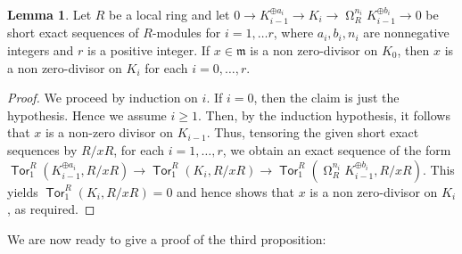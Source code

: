 \documentclass{amsart}
\theoremstyle{plain} %
\theoremstyle{definition}
\newtheorem{lem}[thm]{Lemma}
\newcommand{\fm}{\mathfrak{m}}
\def\Tor{\operatorname{\mathsf{Tor}}}
\DeclareMathOperator{\syz}{\Omega}
\begin{document}
\begin{lem} \label{rmk1} Let $R$ be a local ring and let  $0 \to K_{i-1}^{\oplus a_i} \to K_i \to \syz^{n_i}_R K_{i-1}^{\oplus b_i} \to 0$ be short exact sequences of $R$-modules for $i=1, \ldots r$, where $a_i, b_i, n_i$ are nonnegative integers and $r$ is a positive integer. If $x\in \fm$ is a non zero-divisor on $K_0$, then $x$ is a non zero-divisor on $K_i$ for each $i=0, \ldots, r$.
\end{lem}

\begin{proof} We proceed by induction on $i$. If $i=0$, then the claim is just the hypothesis. Hence we assume $i\geq 1$. Then, by the induction hypothesis, it follows that $x$ is a non-zero divisor on $K_{i-1}$. Thus, tensoring the given short exact sequences by $R/xR$, for each $i=1, \ldots, r$, we obtain an exact sequence of the form $\Tor_1^R(K_{i-1}^{\oplus a_i}, R/xR) \to \Tor_1^R(K_i,R/xR) \to \Tor_1^R(\syz^{n_i}_R K_{i-1}^{\oplus b_i}, R/xR)$. This yields $\Tor_1^R(K_i,R/xR) =0$ and hence shows that $x$ is a non zero-divisor on $K_i$, as required.
\end{proof}

We are now ready to give a proof of the third proposition:
\end{document}
